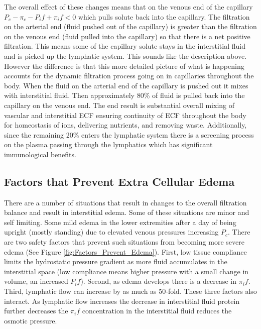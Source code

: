 The overall effect of these changes means that on the venous end of the capillary $P_c - \pi_c - P_if + \pi_if < 0$ which pulls solute back into the capillary.  The filtration on the arterial end (fluid pushed out of the capillary) is greater than the filtration on the venous end (fluid pulled into the capillary) so that there is a net positive filtration. This means some of the capillary solute stays in the interstitial fluid and is picked up the lymphatic system. This sounds like the description above. However the difference is that this more detailed picture of what is happening accounts for the dynamic filtration process going on in capillaries throughout the body. When the fluid on the arterial end of the capillary is pushed out it mixes with interstitial fluid. Then approximately 80\% of fluid is pulled back into the capillary on the venous end. The end result is substantial overall mixing of vascular and interstitial ECF ensuring continuity of ECF throughout the body for homeostasis of ions, delivering nutrients, and removing waste. Additionally, since the remaining 20\% enters the lymphatic system there is a screening process on the plasma passing through the lymphatics which has significant immunological benefits.

\subsection{Factors that Prevent Extra Cellular Edema}

There are a number of situations that result in changes to the overall filtration balance and result in interstitial edema. Some of these situations are minor and self limiting. Some mild edema in the lower extremities after a day of being upright (mostly standing) due to elevated venous pressures increasing $P_c$. There are two safety factors that prevent such situations from becoming more severe edema (See Figure \ref{fig:Factors_Prevent_Edema}). First, low tissue compliance limits the hydrostatic pressure gradient as more fluid accumulates in the interstitial space (low compliance means higher pressure with a small change in volume, an increased $P_if$). Second, as edema develops there is a decrease in $\pi_if$. Third, lymphatic flow can increase by as much as 50-fold. These three factors also interact. As lymphatic flow increases the decrease in interstitial fluid protein further decreases the $\pi_if$ concentration in the interstitial fluid reduces the osmotic pressure.

